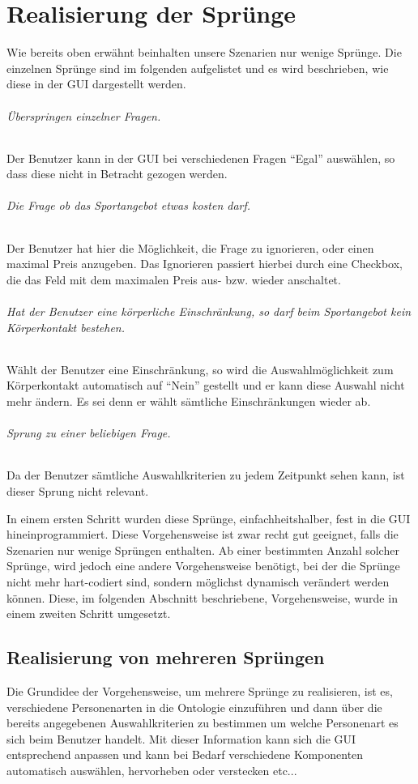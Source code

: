 \chapter{Realisierung der Sprünge} \label{cha:sprunge}
Wie bereits oben erwähnt beinhalten unsere Szenarien nur wenige Sprünge. Die einzelnen Sprünge sind im folgenden aufgelistet und es wird beschrieben, wie diese in der GUI dargestellt werden. 

\subparagraph{Überspringen einzelner Fragen.} Der Benutzer kann in der GUI bei verschiedenen Fragen "`Egal"' auswählen, so dass diese nicht in Betracht gezogen werden.
\subparagraph{Die Frage ob das Sportangebot etwas kosten darf.} Der Benutzer hat hier die Möglichkeit, die Frage zu ignorieren, oder einen maximal Preis anzugeben. Das Ignorieren passiert hierbei durch eine Checkbox, die das Feld mit dem maximalen Preis aus- bzw. wieder anschaltet.
\subparagraph{Hat der Benutzer eine körperliche Einschränkung, so darf beim Sportangebot kein Körperkontakt bestehen.} Wählt der Benutzer eine Einschränkung, so wird die Auswahlmöglichkeit zum Körperkontakt automatisch auf "`Nein"' gestellt und er kann diese Auswahl nicht mehr ändern. Es sei denn er wählt sämtliche Einschränkungen wieder ab.
\subparagraph{Sprung zu einer beliebigen Frage.} Da der Benutzer sämtliche Auswahlkriterien zu jedem Zeitpunkt sehen kann, ist dieser Sprung nicht relevant.

In einem ersten Schritt wurden diese Sprünge, einfachheitshalber, fest in die GUI hineinprogrammiert. Diese Vorgehensweise ist zwar recht gut geeignet, falls die Szenarien nur wenige Sprüngen enthalten. Ab einer bestimmten Anzahl solcher Sprünge, wird jedoch eine andere Vorgehensweise benötigt, bei der die Sprünge nicht mehr hart-codiert sind, sondern möglichst dynamisch verändert werden können. Diese, im folgenden Abschnitt beschriebene, Vorgehensweise, wurde in einem zweiten Schritt umgesetzt.   

\section{Realisierung von mehreren Sprüngen}

Die Grundidee der Vorgehensweise, um mehrere Sprünge zu realisieren, ist es, verschiedene Personenarten in die Ontologie einzuführen und dann über die bereits angegebenen Auswahlkriterien zu bestimmen um welche Personenart es sich beim Benutzer handelt. Mit dieser Information kann sich die GUI entsprechend anpassen und kann bei Bedarf verschiedene Komponenten automatisch auswählen, hervorheben oder verstecken etc...

